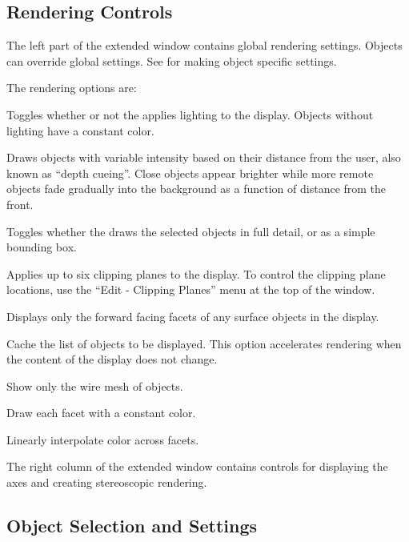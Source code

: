 \subsection{Rendering Controls}
\label{sec:view-rendering} 

The left part of the extended \viewer{} window contains global
rendering settings.  Objects can override global settings.  See
 for making
object specific settings.

The rendering options are:

\begin{description}
   Toggles whether or not the \viewer{} applies
  lighting to the display.  Objects without lighting have a constant
  color.
        
   Draws objects with variable intensity based on their
  distance from the user, also known as ``depth cueing''.  Close
  objects appear brighter while more remote objects fade gradually
  into the background as a function of distance from the front.
  
   Toggles whether the \viewer{} draws the selected
  objects in full detail, or as a simple bounding box.
  
   Applies up to six clipping planes to the
  display.  To control the clipping plane locations, use the ``Edit
  -\ra{} Clipping Planes'' menu at the top of the \viewer{} window.
  
   Displays only the forward facing facets of any
  surface objects in the display.
  
   Cache the list of objects to be displayed.
  This option accelerates rendering when the content of the display
  does not change.

   Show only the wire mesh of objects.

   Draw each facet with a constant color.

   Linearly interpolate color across facets. 
\end{description}

The right column of the extended \viewer{} window contains controls
for displaying the axes and creating stereoscopic rendering.  

\subsection{Object Selection and Settings}
\label{sec:object-settings}

